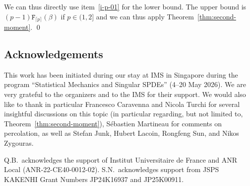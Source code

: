 \documentclass[11pt]{amsart}
\numberwithin{equation}{section}
\newcommand*{\tF}{\mathtt{F}}
\theoremstyle{plain}
\theoremstyle{definition}
\theoremstyle{remark}
\begin{document}
We can thus directly use item~\ref{i-p-01} for the lower bound.
The upper bound is  \((p-1) \tF_{\lceil p\rceil}(\beta)\) if \(p\in (1,2]\) and we can thus apply Theorem~\ref{thm:second-moment}.
\qed


\subsection*{Acknowledgements}
This work has been initiated during our stay at IMS in Singapore during the program ``Statistical Mechanics and Singular SPDEs'' (4--20 May 2026).
We are very grateful to the organizers and to the IMS for their support.
We would also like to thank in particular Francesco Caravenna and Nicola Turchi for several insightful discussions on this topic (in particular regarding, but not limited to, Theorem~\ref{thm:second-moment}), Sébastien Martineau for comments on percolation, as well as Stefan Junk, Hubert Lacoin, Rongfeng Sun, and Nikos Zygouras.

Q.B.\ acknowledges the support of Institut Universitaire de France and ANR Local (ANR-22-CE40-0012-02).
S.N.\ acknowledges support from JSPS KAKENHI Grant Numbers JP24K16937 and JP25K00911.






\end{document}
